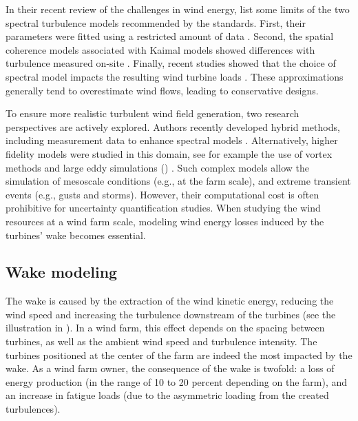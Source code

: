 In their recent review of the challenges in wind energy, \citep{veers_2019_review} list some limits of the two spectral turbulence models recommended by the standards. 
First, their parameters were fitted using a restricted amount of data \citep{dimitrov_2017_turbulence_models_on_loads}. 
Second, the spatial coherence models associated with Kaimal models showed differences with turbulence measured on-site \citep{saranyasoontorn_2004}.  
Finally, recent studies showed that the choice of spectral model impacts the resulting wind turbine loads \citep{doubrawa_2019}. 
These approximations generally tend to overestimate wind flows, leading to conservative designs. 

To ensure more realistic turbulent wind field generation, two research perspectives are actively explored. 
Authors recently developed hybrid methods, including measurement data to enhance spectral models \citep{dimitrov_2017_constrained_turbulence}. 
Alternatively, higher fidelity models were studied in this domain, see for example the use of vortex methods \citep{branlard_2017_book} and large eddy simulations () \citep{doubrawa_2019,bui_2022_mesoscale_LES}.  
Such complex models allow the simulation of mesoscale conditions (e.g., at the farm scale), and extreme transient events (e.g., gusts and storms). 
However, their computational cost is often prohibitive for uncertainty quantification studies. 
When studying the wind resources at a wind farm scale, modeling wind energy losses induced by the turbines' wake becomes essential. 



\subsection{Wake modeling}\label{sec:222}

The wake is caused by the extraction of the wind kinetic energy, reducing the wind speed and increasing the turbulence downstream of the turbines (see the illustration in ). 
In a wind farm, this effect depends on the spacing between turbines, as well as the ambient wind speed and turbulence intensity. 
The turbines positioned at the center of the farm are indeed the most impacted by the wake. 
As a wind farm owner, the consequence of the wake is twofold: a loss of energy production (in the range of 10 to 20 percent depending on the farm), and an increase in fatigue loads (due to the asymmetric loading from the created turbulences).

